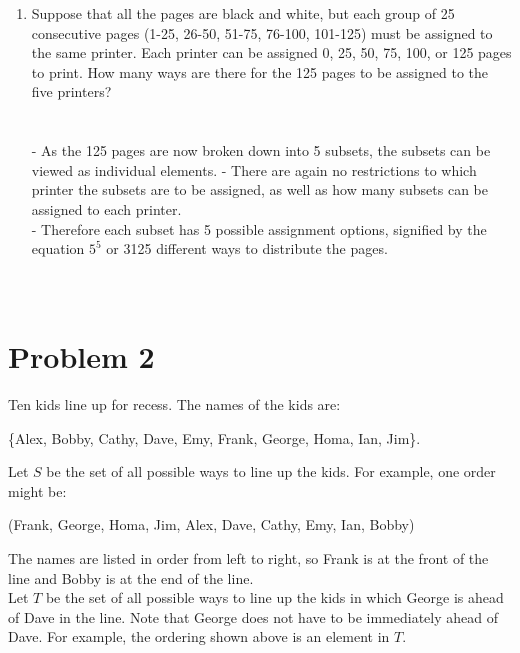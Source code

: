 \documentclass{amsart}
\theoremstyle{definition}
\theoremstyle{Exercise}
\theoremstyle{remark}
\theoremstyle{rule}
\numberwithin{equation}{section}
\begin{document}
\begin{enumerate}[label=(\alph*)]
        \\\\
 \item Suppose that all the pages are black and white, but each group of 25 consecutive pages (1-25, 26-50, 51-75, 76-100, 101-125) must be assigned to the same 
 printer. Each printer can be assigned 0, 25, 50, 75, 100, or 125 pages\\ to print.
How many ways are there for the 125 pages to be assigned to the five printers?\\\\
\vspace*{0.5in}\\
  - As the 125 pages are now broken down into 5 subsets, the subsets can be viewed as individual elements.
  - There are again no restrictions to which printer the subsets are to be assigned, as well as how many subsets can be assigned to each printer.\\
  - Therefore each subset has 5 possible assignment options, signified by the equation $5^5$ or 3125 different ways to distribute the pages.\\ 
        \\\\
   \end{enumerate}
 \newpage
\vspace*{0.2in}
\section*{Problem 2}
Ten kids line up for recess. The names of the kids are:\\
\begin{center}
 \{Alex, Bobby, Cathy, Dave, Emy, Frank, George, Homa, Ian, Jim\}.\\
\end{center}
Let $S$ be the set of all possible ways to line up the kids. For example, one order might be:
\begin{center}
  (Frank, George, Homa, Jim, Alex, Dave, Cathy, Emy, Ian, Bobby)\\
\end{center}

The names are listed in order from left to right, so Frank is at the front of the line and Bobby is at the end of the line.\\

Let $T$ be the set of all possible ways to line up the kids in which George is ahead of Dave in the line. Note that George does not have to be immediately 
ahead of Dave. For example, the ordering shown above is an element in $T$.\\
\end{document}
